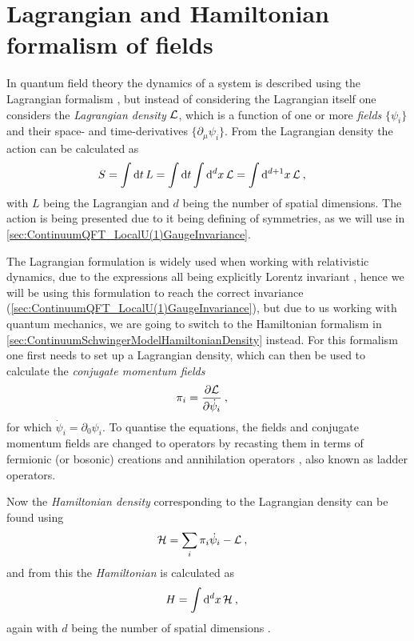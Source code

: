 \documentclass[../main.tex]{subfiles} %
\begin{document}
\section{Lagrangian and Hamiltonian formalism of fields} \label{sec:LagrangianAndHamiltonianFormalismOfFields}

In quantum field theory the dynamics of a system is described using the Lagrangian formalism \cite{peskin_introToQFT_1995,Clark_LagrangianQFT_1988}, but instead of considering the Lagrangian itself one considers the \emph{Lagrangian density} $\mathcal{L}$, which is a function of one or more \emph{fields} $\{\psi_i\}$ and their space- and time-derivatives $\{\partial_\mu \psi_i\}$. From the Lagrangian density the action can be calculated as
\begin{align}
    S &= \int \dd{t} L = \int \dd{t} \int \dd[d]{x} \mathcal{L} = \int \dd[d+1]{x} \mathcal{L} \: ,
\end{align}
with $L$ being the Lagrangian and $d$ being the number of spatial dimensions. The action is being presented due to it being defining of symmetries, as we will use in \cref{sec:ContinuumQFT_LocalU(1)GaugeInvariance}.

The Lagrangian formulation is widely used when working with relativistic dynamics, due to the expressions all being explicitly Lorentz invariant \cite{peskin_introToQFT_1995}, hence we will be using this formulation to reach the correct invariance (\cref{sec:ContinuumQFT_LocalU(1)GaugeInvariance}), but due to us working with quantum mechanics, we are going to switch to the Hamiltonian formalism in \cref{sec:ContinuumSchwingerModelHamiltonianDensity} instead. For this formalism one first needs to set up a Lagrangian density, which can then be used to calculate the \emph{conjugate momentum fields} \cite{peskin_introToQFT_1995,Clark_LagrangianQFT_1988}
\begin{align} \label{eq:LagrangianFormalism_ConjugateMomentumField}
    \pi_i &= \pdv{\mathcal{L}}{\dot{\psi}_i} \: ,
\end{align}
for which $\dot{\psi}_i = \partial_0\psi_i$. To quantise the equations, the fields and conjugate momentum fields are changed to operators by recasting them in terms of fermionic (or bosonic) creations and annihilation operators \cite{panyella_masterThesis_2019}, also known as ladder operators.

Now the \emph{Hamiltonian density} corresponding to the Lagrangian density can be found using
\begin{align} \label{eq:LagrangianFormalism_HamiltonianDensity}
    \mathcal{H} &= \sum_i \pi_i \dot{\psi}_i - \mathcal{L} \: ,
\end{align}
and from this the \emph{Hamiltonian} is calculated as
\begin{align} \label{eq:LagrangianFormalism_Hamiltonian}
    H &= \int \dd[d]{x} \mathcal{H} \: ,
\end{align}
again with $d$ being the number of spatial dimensions \cite{Clark_LagrangianQFT_1988}.
\end{document}

